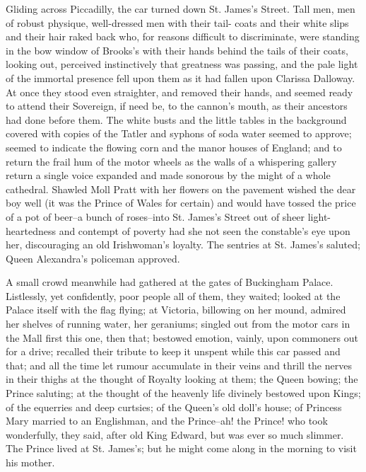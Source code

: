 \documentclass[lang=cn,10pt]{elegantbook}
\begin{document}
Gliding across Piccadilly, the car turned down St. James's Street.
Tall men, men of robust physique, well-dressed men with their tail-
coats and their white slips and their hair raked back who, for
reasons difficult to discriminate, were standing in the bow window
of Brooks's with their hands behind the tails of their coats,
looking out, perceived instinctively that greatness was passing,
and the pale light of the immortal presence fell upon them as it
had fallen upon Clarissa Dalloway.  At once they stood even
straighter, and removed their hands, and seemed ready to attend
their Sovereign, if need be, to the cannon's mouth, as their
ancestors had done before them.  The white busts and the little
tables in the background covered with copies of the Tatler and
syphons of soda water seemed to approve; seemed to indicate the
flowing corn and the manor houses of England; and to return the
frail hum of the motor wheels as the walls of a whispering gallery
return a single voice expanded and made sonorous by the might of a
whole cathedral.  Shawled Moll Pratt with her flowers on the
pavement wished the dear boy well (it was the Prince of Wales for
certain) and would have tossed the price of a pot of beer--a bunch
of roses--into St. James's Street out of sheer light-heartedness
and contempt of poverty had she not seen the constable's eye upon
her, discouraging an old Irishwoman's loyalty.  The sentries at St.
James's saluted; Queen Alexandra's policeman approved.

A small crowd meanwhile had gathered at the gates of Buckingham
Palace.  Listlessly, yet confidently, poor people all of them, they
waited; looked at the Palace itself with the flag flying; at
Victoria, billowing on her mound, admired her shelves of running
water, her geraniums; singled out from the motor cars in the Mall
first this one, then that; bestowed emotion, vainly, upon commoners
out for a drive; recalled their tribute to keep it unspent while
this car passed and that; and all the time let rumour accumulate in
their veins and thrill the nerves in their thighs at the thought of
Royalty looking at them; the Queen bowing; the Prince saluting; at
the thought of the heavenly life divinely bestowed upon Kings; of
the equerries and deep curtsies; of the Queen's old doll's house;
of Princess Mary married to an Englishman, and the Prince--ah! the
Prince! who took wonderfully, they said, after old King Edward, but
was ever so much slimmer.  The Prince lived at St. James's; but he
might come along in the morning to visit his mother.
\end{document}
